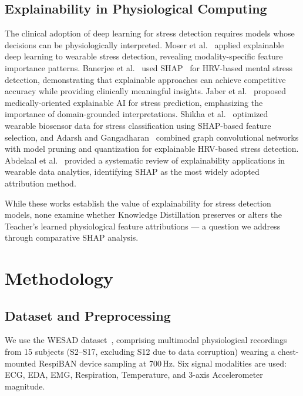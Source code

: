 \documentclass[conference]{IEEEtran}
\begin{document}
\subsection{Explainability in Physiological Computing}

The clinical adoption of deep learning for stress detection requires models whose decisions can be physiologically interpreted. Moser et al.~\cite{moser2024explainable} applied explainable deep learning to wearable stress detection, revealing modality-specific feature importance patterns. Banerjee et al.~\cite{banerjee2023heart} used SHAP~\cite{lundberg2017unified} for HRV-based mental stress detection, demonstrating that explainable approaches can achieve competitive accuracy while providing clinically meaningful insights. Jaber et al.~\cite{jaber2022medically} proposed medically-oriented explainable AI for stress prediction, emphasizing the importance of domain-grounded interpretations. Shikha et al.~\cite{shikha2024optimization} optimized wearable biosensor data for stress classification using SHAP-based feature selection, and Adarsh and Gangadharan~\cite{adarsh2024mental} combined graph convolutional networks with model pruning and quantization for explainable HRV-based stress detection. Abdelaal et al.~\cite{abdelaal2024exploring} provided a systematic review of explainability applications in wearable data analytics, identifying SHAP as the most widely adopted attribution method.

While these works establish the value of explainability for stress detection models, none examine whether Knowledge Distillation preserves or alters the Teacher's learned physiological feature attributions --- a question we address through comparative SHAP analysis.

\section{Methodology}

\subsection{Dataset and Preprocessing}

We use the WESAD dataset~\cite{schmidt2018introducing}, comprising multimodal physiological recordings from 15 subjects (S2--S17, excluding S12 due to data corruption) wearing a chest-mounted RespiBAN device sampling at 700\,Hz. Six signal modalities are used: ECG, EDA, EMG, Respiration, Temperature, and 3-axis Accelerometer magnitude.
\end{document}
